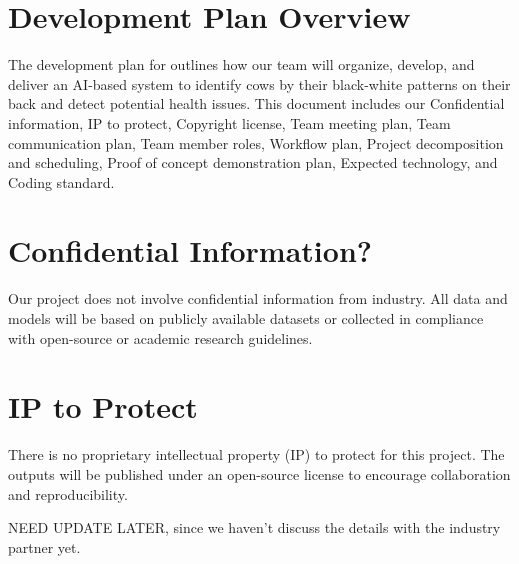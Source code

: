 \documentclass{article}
\begin{document}
\section*{Development Plan Overview}
The development plan for \progname{} outlines how our team will organize, develop, 
and deliver an AI-based system to identify cows by their black-white patterns on their back 
and detect potential health issues. This document includes our Confidential information, 
IP to protect, Copyright license, Team meeting plan, Team communication plan, Team member 
roles, Workflow plan, Project decomposition and scheduling, Proof of concept demonstration 
plan, Expected technology, and Coding standard.


\section{Confidential Information?}


Our project does not involve confidential information from industry. 
All data and models will be based on publicly available datasets or 
collected in compliance with open-source or academic research guidelines.

\section{IP to Protect}


There is no proprietary intellectual property (IP) to protect for this project. 
The outputs will be published under an open-source license to encourage 
collaboration and reproducibility.

NEED UPDATE LATER, since we haven't discuss the details with the industry partner yet.
\end{document}
